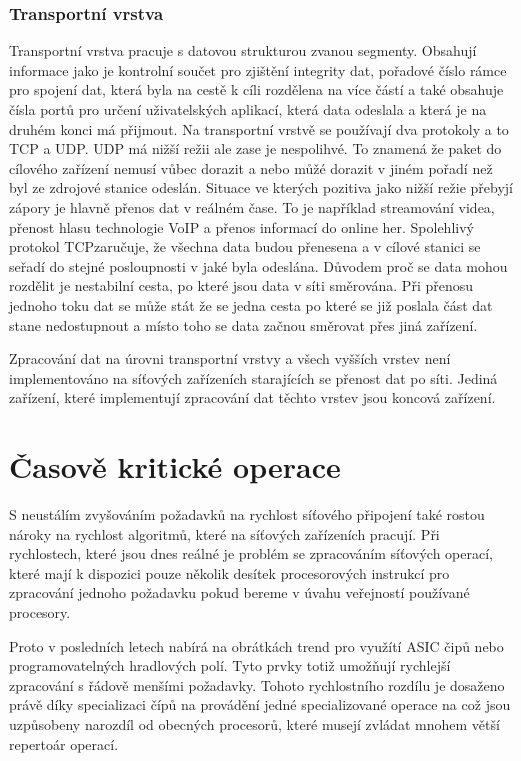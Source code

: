 \subsubsection{Transportní vrstva}\label{layers:transport}
Transportní vrstva pracuje s datovou strukturou zvanou segmenty.
Obsahují informace jako je kontrolní součet pro zjištění integrity dat,
pořadové číslo rámce pro spojení dat, která byla na cestě k cíli rozdělena na více částí a také obsahuje čísla portů
pro určení uživatelských aplikací, která data odeslala a která je na druhém konci má přijmout.
Na transportní vrstvě se používají dva protokoly a to TCP a UDP. UDP má nižší režii ale zase je nespolihvé.
To znamená že paket do cílového zařízení nemusí vůbec dorazit a nebo můžé dorazit v jiném pořadí než byl ze
zdrojové stanice odeslán. Situace ve kterých pozitiva jako nižší režie přebyjí zápory je hlavně přenos dat v
reálném čase. To je například streamování videa, přenost hlasu technologie VoIP a přenos informací do online her.
Spolehlivý protokol TCPzaručuje, že všechna data budou přenesena a v cílové stanici se seřadí do
stejné posloupnosti v jaké byla odeslána. Důvodem proč se data mohou rozdělit je nestabilní cesta,
po které jsou data v síti směrována. Při přenosu jednoho toku dat se může stát že se jedna cesta po které se
již poslala část dat stane nedostupnout a místo toho se data začnou směrovat přes jiná zařízení.

Zpracování dat na úrovni transportní vrstvy a všech vyšších vrstev není implementováno na síťových
zařízeních starajících se přenost dat po síti. Jediná zařízení, které implementují zpracování
dat těchto vrstev jsou koncová zařízení.

\section{Časově kritické operace}
S neustálím zvyšováním požadavků na rychlost síťového připojení také rostou nároky na rychlost
algoritmů, které na síťových zařízeních pracují. Při rychlostech, které jsou dnes reálné je problém se zpracováním
síťových operací, které mají k dispozici pouze několik desítek procesorových instrukcí pro zpracování jednoho požadavku
pokud bereme v úvahu veřejností používané procesory.

Proto v posledních letech nabírá na obrátkách trend pro využítí ASIC čipů nebo programovatelných hradlových polí.
Tyto prvky totiž umožňují rychlejší zpracování s řádově menšími požadavky.
Tohoto rychlostního rozdílu je dosaženo právě díky specializaci čípů na provádění jedné specializované operace na což jsou uzpůsobeny
narozdíl od obecných procesorů, které musejí zvládat mnohem větší repertoár operací.

